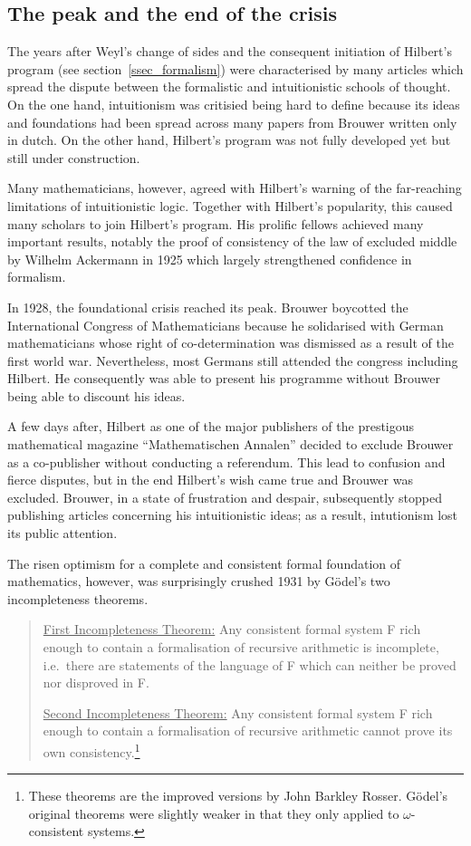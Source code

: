 \documentclass[hidelinks]{article}
\begin{document}
\subsection{The peak and the end of the crisis}\label{ssec_end_crisis}
The years after Weyl's change of sides and the consequent initiation of Hilbert's program (see section~\ref{ssec_formalism}) were characterised by many articles which spread the dispute between the formalistic and intuitionistic schools of thought. On the one hand, intuitionism was critisied being hard to define because its ideas and foundations had been spread across many papers from Brouwer written only in dutch. On the other hand, Hilbert's program was not fully developed yet but still under construction.

Many mathematicians, however, agreed with Hilbert's warning of the far-reaching limitations of intuitionistic logic. Together with Hilbert's popularity, this caused many scholars to join Hilbert's program. His prolific fellows achieved many important results, notably the proof of consistency of the law of excluded middle by Wilhelm Ackermann in 1925 which largely strengthened confidence in formalism.

In 1928, the foundational crisis reached its peak. Brouwer boycotted the International Congress of Mathematicians because he solidarised with German mathematicians whose right of co-determination was dismissed as a result of the first world war. Nevertheless, most Germans still attended the congress including Hilbert. He consequently was able to present his programme without Brouwer being able to discount his ideas.

A few days after, Hilbert as one of the major publishers of the prestigous mathematical magazine ``Mathematischen Annalen'' decided to exclude Brouwer as a co-publisher without conducting a referendum. This lead to confusion and fierce disputes, but in the end Hilbert's wish came true and Brouwer was excluded. Brouwer, in a state of frustration and despair, subsequently stopped publishing articles concerning his intuitionistic ideas; as a result, intutionism lost its public attention.  

The risen optimism for a complete and consistent formal foundation of mathematics, however, was surprisingly crushed 1931 by Gödel's two incompleteness theorems.

\begin{quote}
\underline{First Incompleteness Theorem:} Any consistent formal system F rich enough to contain a formalisation of recursive arithmetic is incomplete, i.e.\ there are statements of the language of F which can neither be proved nor disproved in F.

\underline{Second Incompleteness Theorem:} Any consistent formal system F rich enough to contain a formalisation of recursive arithmetic cannot prove its own consistency.\footnote{These theorems are the improved versions by John Barkley Rosser. Gödel's original theorems were slightly weaker in that they only applied to $\omega$-consistent systems.\cite[pp.~293--320]{fraenkel_incompleteness}}
\end{quote}
\end{document}
